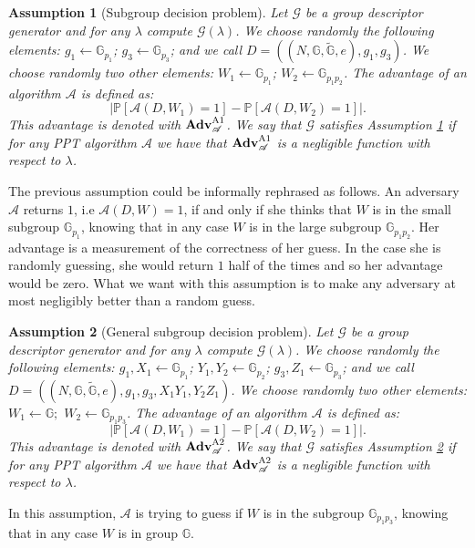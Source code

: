 \documentclass[a4paper,10pt]{article}
\newtheorem{assumption}{Assumption}
\newcommand{\G}{\mathbb{G}}
\newcommand{\GT}{\widetilde{\G}} \newcommand{\N}{\mathbb{N}}
\newcommand{\prob}[1]{\mathbb{P}\left[#1\right]}
\newcommand{\adv}{\textbf{Adv}}
\begin{document}
	\begin{assumption}[Subgroup decision problem]
		\label{a1}
		Let $\mathscr{G}$ be a group descriptor generator and for any $\lambda$ compute $\mathscr{G}(\lambda)$.
		We choose randomly the following elements:
			$g_1 \leftarrow{} \G_{p_1}$;
			$g_3 \leftarrow{} \G_{p_3}$;
and we call $D=\left((N,\G,\GT,e),g_1,g_3\right)$. 
		We choose randomly two other elements:
			$W_1 \leftarrow{} \G_{p_1}$;
			$W_2 \leftarrow{} \G_{p_1p_2}$.
		The advantage of an algorithm $\mathscr{A}$ is defined as:
		\[
			\left|\prob{\mathscr{A}(D,W_1)=1}-\prob{\mathscr{A}(D,W_2)=1}\right|.
		\]
		This advantage is denoted with $\adv^{\textnormal{A1}}_{\mathscr{A}}$.
		We say that $\mathscr{G}$ satisfies Assumption \ref{a1} if for any PPT algorithm $\mathscr{A}$ we have that $\adv^{\textnormal{A1}}_{\mathscr{A}}$ is a negligible function with respect to $\lambda$.
	\end{assumption}
	\noindent The previous assumption could be informally rephrased as follows.
An adversary $\mathscr{A}$ returns $1$, i.e $\mathscr{A}(D,W)=1$, if and only if she thinks that $W$ is 
in the small subgroup $\G_{p_1}$, knowing that in any case $W$ is in the large subgroup $\G_{p_1p_2}$.
Her advantage is a measurement of the correctness of her guess.
In the case she is randomly guessing, she would return $1$ half of the times and so her advantage
would be zero. What we want with this assumption is to make any adversary at most negligibly better than a random guess.
	\begin{assumption}[General subgroup decision problem]
		\label{a2}
		Let $\mathscr{G}$ be a group descriptor generator and for any $\lambda$ compute $\mathscr{G}(\lambda)$. 
		We choose randomly the following elements:
			$g_1,X_1 \leftarrow{} \G_{p_1}$;
			$Y_1,Y_2 \leftarrow{} \G_{p_2}$;
			$g_3,Z_1 \leftarrow{} \G_{p_3}$;
		and we call \linebreak $D=\left((N,\G,\GT,e),g_1,g_3,X_1Y_1,Y_2Z_1\right)$.
		We choose randomly two other elements:
			$W_1 \leftarrow{} \G;$
			$W_2 \leftarrow{} \G_{p_1p_3}$.
		The advantage of an algorithm $\mathscr{A}$ is defined as:
		\[
			\left|\prob{\mathscr{A}(D,W_1)=1}-\prob{\mathscr{A}(D,W_2)=1}\right|.
		\]
		This advantage is denoted with $\adv^{\textnormal{A2}}_{\mathscr{A}}$.
		We say that $\mathscr{G}$ satisfies Assumption \ref{a2} if for any PPT algorithm $\mathscr{A}$ we have that $\adv^{\textnormal{A2}}_{\mathscr{A}}$ is a negligible function with respect to $\lambda$.
	\end{assumption}
	\noindent In this assumption, $\mathscr{A}$ is trying to guess if $W$ is  in the subgroup $\G_{p_1p_3}$, knowing that in any case $W$ is in  group $\G$.
\end{document}
